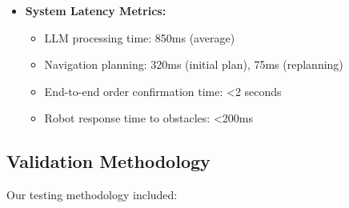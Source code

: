 \documentclass[12pt]{article}
\begin{document}
\begin{itemize}
    
    \item \textbf{System Latency Metrics:}
    \begin{itemize}
        \item LLM processing time: 850ms (average)
        \item Navigation planning: 320ms (initial plan), 75ms (replanning)
        \item End-to-end order confirmation time: <2 seconds
        \item Robot response time to obstacles: <200ms
    \end{itemize}
\end{itemize}

\subsection{Validation Methodology}

Our testing methodology included:
\end{document}
